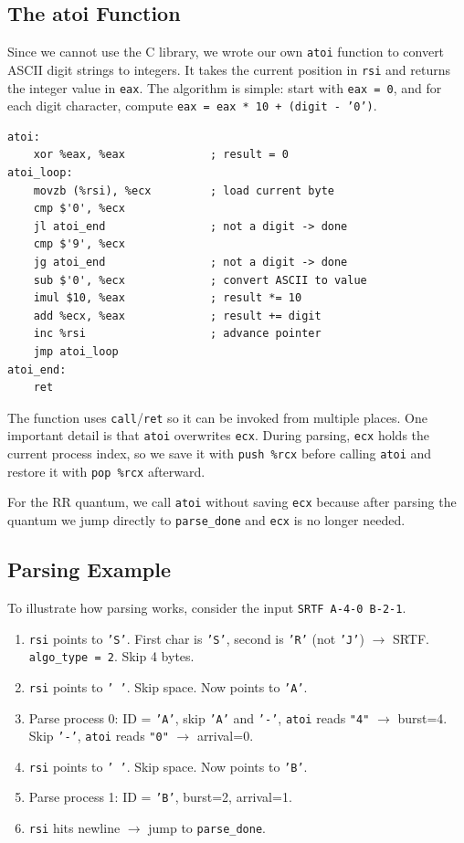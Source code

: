 \documentclass[a4paper,12pt]{article}
\begin{document}
\subsection{The atoi Function}

Since we cannot use the C library, we wrote our own \texttt{atoi} function to convert ASCII digit strings to integers. It takes the current position in \texttt{rsi} and returns the integer value in \texttt{eax}. The algorithm is simple: start with \texttt{eax = 0}, and for each digit character, compute \texttt{eax = eax * 10 + (digit - '0')}.

\begin{lstlisting}[style=AsmStyle]
atoi:
    xor %eax, %eax             ; result = 0
atoi_loop:
    movzb (%rsi), %ecx         ; load current byte
    cmp $'0', %ecx
    jl atoi_end                ; not a digit -> done
    cmp $'9', %ecx
    jg atoi_end                ; not a digit -> done
    sub $'0', %ecx             ; convert ASCII to value
    imul $10, %eax             ; result *= 10
    add %ecx, %eax             ; result += digit
    inc %rsi                   ; advance pointer
    jmp atoi_loop
atoi_end:
    ret
\end{lstlisting}

The function uses \texttt{call}/\texttt{ret} so it can be invoked from multiple places. One important detail is that \texttt{atoi} overwrites \texttt{ecx}. During parsing, \texttt{ecx} holds the current process index, so we save it with \texttt{push \%rcx} before calling \texttt{atoi} and restore it with \texttt{pop \%rcx} afterward.

For the RR quantum, we call \texttt{atoi} without saving \texttt{ecx} because after parsing the quantum we jump directly to \texttt{parse\_done} and \texttt{ecx} is no longer needed.

\subsection{Parsing Example}

To illustrate how parsing works, consider the input \texttt{SRTF A-4-0 B-2-1}.

\begin{enumerate}
    \item \texttt{rsi} points to \texttt{'S'}. First char is \texttt{'S'}, second is \texttt{'R'} (not \texttt{'J'}) $\rightarrow$ SRTF. \texttt{algo\_type = 2}. Skip 4 bytes.
    \item \texttt{rsi} points to \texttt{' '}. Skip space. Now points to \texttt{'A'}.
    \item Parse process 0: ID = \texttt{'A'}, skip \texttt{'A'} and \texttt{'-'}, \texttt{atoi} reads \texttt{"4"} $\rightarrow$ burst=4. Skip \texttt{'-'}, \texttt{atoi} reads \texttt{"0"} $\rightarrow$ arrival=0.
    \item \texttt{rsi} points to \texttt{' '}. Skip space. Now points to \texttt{'B'}.
    \item Parse process 1: ID = \texttt{'B'}, burst=2, arrival=1.
    \item \texttt{rsi} hits newline $\rightarrow$ jump to \texttt{parse\_done}.
\end{enumerate}
\end{document}
